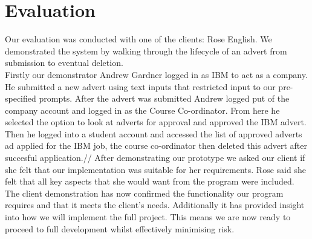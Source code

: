 \documentclass{l3deliverable}
\begin{document}

\section{Evaluation}

Our evaluation was conducted with one of the clients: Rose English. We demonstrated the system by walking through the lifecycle of an advert from submission to eventual deletion.\\
Firstly our demonstrator Andrew Gardner logged in as IBM to act as a company. He submitted a new advert using text inputs that restricted input to our pre-specified prompts. After the advert was submitted Andrew logged put of the company account and logged in as the Course Co-ordinator. From here he selected the option to look at adverts for approval and approved the IBM advert. Then he logged into a student account and accessed the list of approved adverts ad applied for the IBM job, the course co-ordinator then deleted this advert after succesful application.//
After demonstrating our prototype we asked our client if she felt that
our implementation was suitable for her requirements. Rose said she
felt that all key aspects that she would want from the program were
included.\\
The client demonstration has now confirmed the functionality our
program requires and that it meets the client's needs. Additionally it
has provided insight into how we will implement the full project. This
means we are now ready to proceed to full development whilst
effectively minimising risk.

\end{document}

